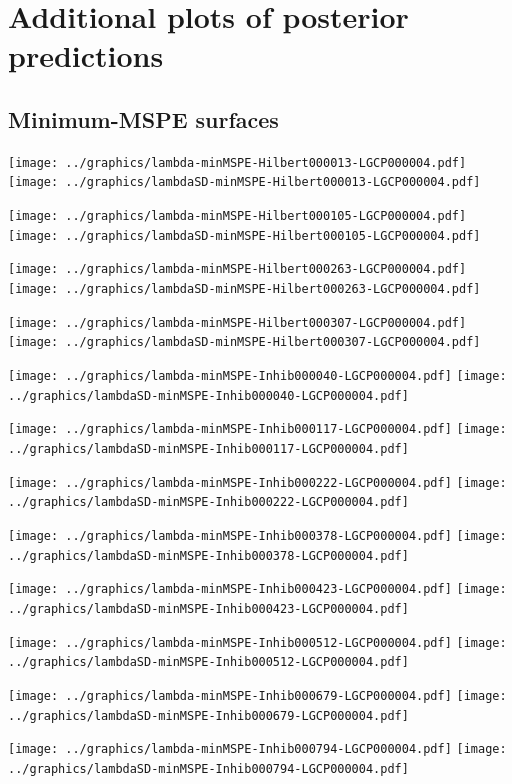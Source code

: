 \documentclass[review]{elsarticle}
\begin{document}
\section{Additional plots of posterior predictions}

\subsection{Minimum-MSPE surfaces}

\texttt{[image: ../graphics/lambda-minMSPE-Hilbert000013-LGCP000004.pdf]}
\texttt{[image: ../graphics/lambdaSD-minMSPE-Hilbert000013-LGCP000004.pdf]}

\texttt{[image: ../graphics/lambda-minMSPE-Hilbert000105-LGCP000004.pdf]}
\texttt{[image: ../graphics/lambdaSD-minMSPE-Hilbert000105-LGCP000004.pdf]}

\texttt{[image: ../graphics/lambda-minMSPE-Hilbert000263-LGCP000004.pdf]}
\texttt{[image: ../graphics/lambdaSD-minMSPE-Hilbert000263-LGCP000004.pdf]}

\texttt{[image: ../graphics/lambda-minMSPE-Hilbert000307-LGCP000004.pdf]}
\texttt{[image: ../graphics/lambdaSD-minMSPE-Hilbert000307-LGCP000004.pdf]}

\texttt{[image: ../graphics/lambda-minMSPE-Inhib000040-LGCP000004.pdf]}
\texttt{[image: ../graphics/lambdaSD-minMSPE-Inhib000040-LGCP000004.pdf]}

\texttt{[image: ../graphics/lambda-minMSPE-Inhib000117-LGCP000004.pdf]}
\texttt{[image: ../graphics/lambdaSD-minMSPE-Inhib000117-LGCP000004.pdf]}

\texttt{[image: ../graphics/lambda-minMSPE-Inhib000222-LGCP000004.pdf]}
\texttt{[image: ../graphics/lambdaSD-minMSPE-Inhib000222-LGCP000004.pdf]}

\texttt{[image: ../graphics/lambda-minMSPE-Inhib000378-LGCP000004.pdf]}
\texttt{[image: ../graphics/lambdaSD-minMSPE-Inhib000378-LGCP000004.pdf]}

\texttt{[image: ../graphics/lambda-minMSPE-Inhib000423-LGCP000004.pdf]}
\texttt{[image: ../graphics/lambdaSD-minMSPE-Inhib000423-LGCP000004.pdf]}

\texttt{[image: ../graphics/lambda-minMSPE-Inhib000512-LGCP000004.pdf]}
\texttt{[image: ../graphics/lambdaSD-minMSPE-Inhib000512-LGCP000004.pdf]}

\texttt{[image: ../graphics/lambda-minMSPE-Inhib000679-LGCP000004.pdf]}
\texttt{[image: ../graphics/lambdaSD-minMSPE-Inhib000679-LGCP000004.pdf]}

\texttt{[image: ../graphics/lambda-minMSPE-Inhib000794-LGCP000004.pdf]}
\texttt{[image: ../graphics/lambdaSD-minMSPE-Inhib000794-LGCP000004.pdf]}
\end{document}
